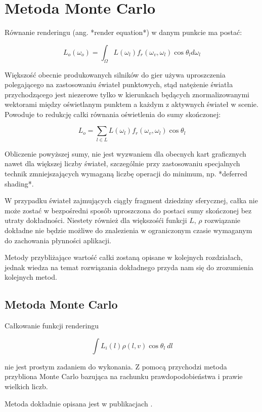 \documentclass[../main.tex]{subfiles}
\begin{document}
\section{Metoda Monte Carlo}

Równanie renderingu (ang. *render equation*) w danym punkcie ma postać:

$$
L_o(\omega_o) = \int_{\Omega} {
    L(\omega_{l})
    f_r(\omega_{v}, \omega_{l})
    \cos \theta_{l}
    d\omega_{l}
}
$$

Większość obecnie produkowanych silników do gier używa uproszczenia
polegającego na zastosowaniu świateł punktowych, stąd natężenie światła
przychodzącego jest niezerowe tylko w kierunkach będących znormalizowanymi
wektorami między oświetlanym punktem a każdym z aktywnych świateł w scenie.
Powoduje to redukcję całki równania oświetlenia do sumy skończonej:

$$ L_o = \sum_{l \in L} L(\omega_l) f_r(\omega_v, \omega_l)\cos \theta_l $$

Obliczenie powyższej sumy, nie jest wyzwaniem dla obecnych kart graficznych
nawet dla większej liczby świateł, szczególnie przy zastosowaniu specjalnych
technik zmniejszających wymaganą liczbę operacji do minimum, np. *deferred
shading*.

W przypadku świateł zajmujących ciągły fragment dziedziny sferycznej, całka nie
może zostać w bezpośredni sposób uproszczona do postaci sumy skończonej bez
utraty dokładności. Niestety również dla większośći funkcji $L$, $\rho$
rozwiązanie dokładne nie będzie możliwe do znalezienia w ograniczonym czasie
wymaganym do zachowania płynności aplikacji.

Metody przybliżające wartość całki zostaną opisane w kolejnych rozdziałach,
jednak wiedza na temat rozwiązania dokładnego przyda nam się do zrozumienia
kolejnych metod.

\subsection{Metoda Monte Carlo}

Całkowanie funkcji renderingu

$$
\int{
    L_i(l)
    \rho(l,v)
    \cos \theta_{l}
    \:dl
} $$

nie jest prostym zadaniem do wykonania. Z pomocą przychodzi metoda przybliona
Monte Carlo bazująca na rachunku prawdopodobieństwa i prawie wielkich liczb.

Metoda dokładnie opisana jest w publikacjach \cite{MonteCarloAnderson}
\cite{Veach}.
\end{document}
